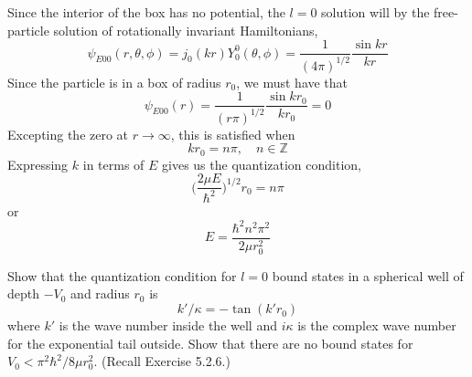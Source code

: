 \documentclass[../principles-of-quantum-mechanics.tex]{subfiles}
\begin{document}
\begin{questions}
		\begin{solution}
			Since the interior of the box has no potential, the $l = 0$ solution will by the free-particle solution of rotationally invariant Hamiltonians,
			$$\psi_{E00}(r, \theta, \phi) = j_0(kr)Y_0^0(\theta, \phi) = \frac{1}{(4\pi)^{1/2}}\frac{\sin kr}{kr}$$
			Since the particle is in a box of radius $r_0$, we must have that
			$$\psi_{E00}(r) = \frac{1}{(r\pi)^{1/2}}\frac{\sin kr_0}{kr_0} = 0$$
			Excepting the zero at $r\to\infty$, this is satisfied when
			$$kr_0 = n\pi, \quad n\in \mathbb{Z}$$ 
			Expressing $k$ in terms of $E$ gives us the quantization condition,
			$$\Big(\frac{2\mu E}{\hbar^2}\Big)^{1/2}r_0 = n\pi$$
			or 
			$$E = \frac{\hbar^2n^2\pi^2}{2\mu r_0^2}$$
		\end{solution}
		
		\question Show that the quantization condition for $l=0$ bound states in a spherical well of depth ${-V_0}$ and radius $r_0$ is
		$$k'/\kappa = {-\tan(k'r_0)}$$
		where $k'$ is the wave number inside the well and $i\kappa$ is the complex wave number for the exponential tail outside. Show that there are no bound states for $V_0 < \pi^2\hbar^2/8\mu r_0^2$. (Recall Exercise 5.2.6.)
		

\end{questions}
\end{document}
